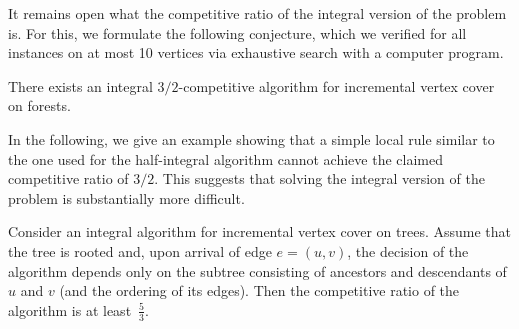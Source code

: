 \documentclass[a4paper,USenglish,cleveref,autoref,thm-restate,pdfa]{lipics-v2021}
\begin{document}
It remains open what the competitive ratio of the integral version of the problem is.
For this, we formulate the following conjecture, which we verified for all instances on at most 10 vertices via exhaustive search with a computer program.

\begin{conjecture}
There exists an integral $3/2$-competitive algorithm for incremental vertex cover on forests.
\end{conjecture}

In the following, we give an example showing that a simple local rule similar to the one used for the half-integral algorithm cannot achieve the claimed competitive ratio of $3/2$.
This suggests that solving the integral version of the problem is substantially more difficult.

\begin{proposition}
\label{prop:integral_lower}
Consider an integral algorithm for incremental vertex cover on trees.
Assume that the tree is rooted and, upon arrival of edge $e=(u,v)$, the decision of the algorithm depends only on the subtree consisting of ancestors and descendants of $u$ and $v$ (and the ordering of its edges).
Then the competitive ratio of the algorithm is at least~$\frac53$.
\end{proposition}
\end{document}
